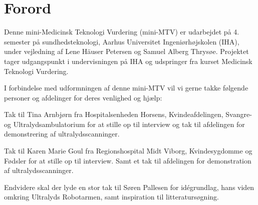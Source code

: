 \chapter{Forord}
Denne mini-Medicinsk Teknologi Vurdering (mini-MTV) er udarbejdet på 4. semester på sundhedsteknologi, Aarhus Universitet Ingeniørhøjskolen (IHA), under vejledning af Lene Häuser Petersen og Samuel Alberg Thrysøe. Projektet tager udgangspunkt i undervisningen på IHA og udspringer fra kurset Medicinsk Teknologi Vurdering. 


I forbindelse med udformningen af denne mini-MTV vil vi gerne takke følgende personer og afdelinger for deres venlighed og hjælp:


Tak til Tina Arnbjørn fra Hospitalsenheden Horsens, Kvindeafdelingen, Svangre- og Ultralydsambulatorium for at stille op til interview og tak til afdelingen for demonstrering af ultralydsscanninger. 


Tak til Karen Marie Goul fra Regionshospital Midt Viborg, Kvindesygdomme og Fødsler for at stille op til interview. Samt et tak til afdelingen for demonstration af ultralydsscanninger. 


Endvidere skal der lyde en stor tak til Søren Pallesen for idégrundlag, hans viden omkring Ultralyds Robotarmen, samt inspiration til litteratursøgning. 

